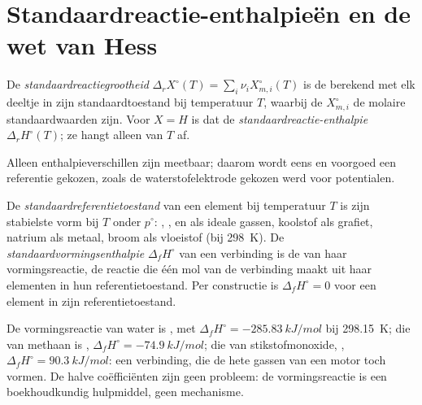 \section{Standaardreactie-enthalpieën en de wet van Hess}

\begin{definition}[Standaardreactiegrootheid]\label{def:b2:reaction-enthalpy:standard-reaction-enthalpy}
De \emph{standaardreactiegrootheid}
$\Delta_r X^\circ(T) = \sum_i\nu_iX_{m,i}^\circ(T)$ is de 
berekend met elk deeltje in zijn standaardtoestand bij temperatuur $T$, waarbij de
$X_{m,i}^\circ$ de molaire standaardwaarden zijn. Voor $X = H$ is dat de
\emph{standaardreactie-enthalpie}
$\Delta_r H^\circ(T)$; ze hangt alleen van $T$ af.
\end{definition}

Alleen enthalpieverschillen zijn meetbaar; daarom wordt eens en voorgoed een
referentie gekozen, zoals de waterstofelektrode gekozen werd voor potentialen.

\begin{definition}\label{def:b2:reaction-enthalpy:formation}
De \emph{standaardreferentietoestand} van een
element bij temperatuur $T$ is zijn stabielste vorm bij $T$ onder $p^\circ$:
, ,  en  als ideale gassen, koolstof als
grafiet, natrium als metaal, broom als vloeistof (bij \qty{298}{K}).
De \emph{standaardvormingsenthalpie}
$\Delta_f H^\circ$ van een verbinding is de 
van haar vormingsreactie, de reactie die één mol van de
verbinding maakt uit haar elementen in hun referentietoestand. Per constructie
is $\Delta_f H^\circ = 0$ voor een element in zijn referentietoestand.
\end{definition}

\begin{example}[Vormingsreacties]\label{ex:b2:reaction-enthalpy:formation}
De vormingsreactie van water is , met
$\Delta_f H^\circ = \qty{-285.83}{kJ/mol}$ bij \qty{298.15}{K}; die van
methaan is , $\Delta_f H^\circ =
\qty{-74.9}{kJ/mol}$; die van stikstofmonoxide, , $\Delta_f H^\circ = \qty{+90.3}{kJ/mol}$: een  verbinding,
die de hete gassen van een motor toch vormen. De halve coëfficiënten
zijn geen probleem: de vormingsreactie is een boekhoudkundig hulpmiddel, geen
mechanisme.
\end{example}

